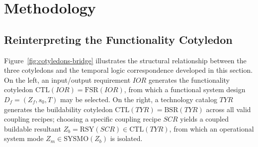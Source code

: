 \section{Methodology} \label{sec:methodology}

\subsection{Reinterpreting the Functionality Cotyledon}
Figure~\ref{fig:cotyledons-bridge} illustrates the structural relationship between the three cotyledons and the temporal logic correspondence developed in this section. On the left, an input/output requirement $IOR$ generates the functionality cotyledon $\mathrm{CTL}(IOR)=\mathrm{FSR}(IOR)$, from which a functional system design $D_f=(Z_f,s_0,T)$ may be selected. On the right, a technology catalog $TYR$ generates the buildability cotyledon $\mathrm{CTL}(TYR)=\mathrm{BSR}(TYR)$ across all valid coupling recipes; choosing a specific coupling recipe $SCR$ yields a coupled buildable resultant $Z_b=\mathrm{RSY}(SCR)\in\mathrm{CTL}(TYR)$, from which an operational system mode $Z_m\in\mathrm{SYSMO}(Z_b)$ is isolated.

